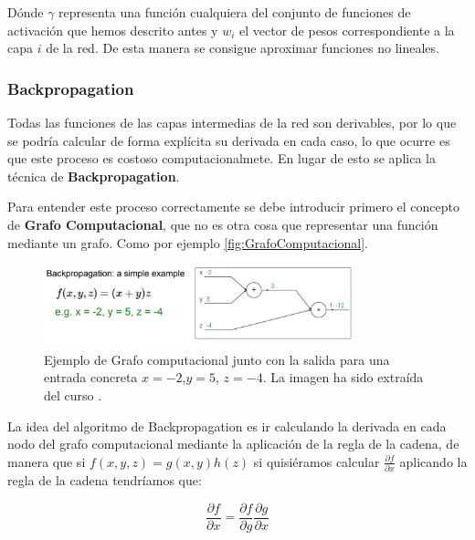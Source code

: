             \noindent Dónde $\gamma$ representa una función cualquiera del conjunto de funciones de activación que hemos descrito antes y $w_i$ el vector de pesos correspondiente a la capa $i$ de la red. De esta manera se consigue aproximar funciones no lineales.
        
        \subsubsection{Backpropagation}
            Todas las funciones de las capas intermedias de la red son derivables, por lo que se podría calcular de forma explícita su derivada en cada caso, lo que ocurre es que este proceso es costoso computacionalmete. En lugar de esto se aplica la técnica de \textbf{Backpropagation}.

            \medskip

            \noindent Para entender este proceso correctamente se debe introducir primero el concepto de \textbf{Grafo Computacional}, que no es otra cosa que representar una función mediante un grafo. Como por ejemplo \autoref{fig:GrafoComputacional}.

            \begin{figure}[!h]
                \centering
                \includegraphics[width=0.8\textwidth]{img/GrafoComputacional.png}
                \caption{Ejemplo de Grafo computacional junto con la salida para una entrada concreta $x=-2$,$y=5$, $z=-4$. La imagen ha sido extraída del curso \cite{StanfordCourse}.}
                \label{fig:GrafoComputacional}
            \end{figure}

            \medskip

            \noindent La idea del algoritmo de Backpropagation es ir calculando la derivada en cada nodo del grafo computacional mediante la aplicación de la regla de la cadena, de manera que si $f(x,y,z)=g(x,y)h(z)$ si quisiéramos calcular $\frac{\partial f}{\partial x}$ aplicando la regla de la cadena tendríamos que: 

            \begin{equation}
                \frac{\partial f}{\partial x}= \frac{\partial f}{\partial g} \frac{\partial g}{\partial x}
            \end{equation}

